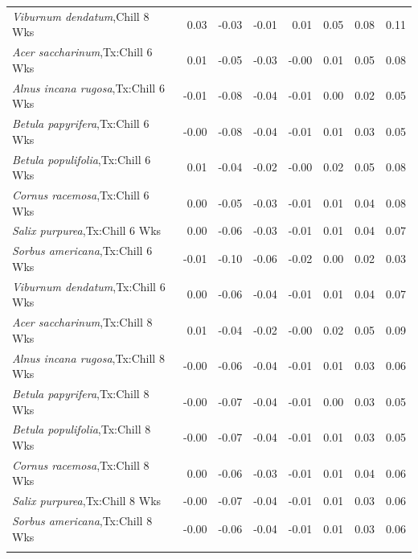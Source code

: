 \documentclass{article}\usepackage[]{graphicx}\usepackage[]{color}
\begin{document}
\begin{longtable}{lrrrrrrr}
  \textit{Viburnum dendatum},Chill 8 Wks & 0.03 & -0.03 & -0.01 & 0.01 & 0.05 & 0.08 & 0.11 \\ 
  \textit{Acer saccharinum},Tx:Chill 6 Wks & 0.01 & -0.05 & -0.03 & -0.00 & 0.01 & 0.05 & 0.08 \\ 
  \textit{Alnus incana rugosa},Tx:Chill 6 Wks & -0.01 & -0.08 & -0.04 & -0.01 & 0.00 & 0.02 & 0.05 \\ 
  \textit{Betula papyrifera},Tx:Chill 6 Wks & -0.00 & -0.08 & -0.04 & -0.01 & 0.01 & 0.03 & 0.05 \\ 
  \textit{Betula populifolia},Tx:Chill 6 Wks & 0.01 & -0.04 & -0.02 & -0.00 & 0.02 & 0.05 & 0.08 \\ 
  \textit{Cornus racemosa},Tx:Chill 6 Wks & 0.00 & -0.05 & -0.03 & -0.01 & 0.01 & 0.04 & 0.08 \\ 
  \textit{Salix purpurea},Tx:Chill 6 Wks & 0.00 & -0.06 & -0.03 & -0.01 & 0.01 & 0.04 & 0.07 \\ 
  \textit{Sorbus americana},Tx:Chill 6 Wks & -0.01 & -0.10 & -0.06 & -0.02 & 0.00 & 0.02 & 0.03 \\ 
  \textit{Viburnum dendatum},Tx:Chill 6 Wks & 0.00 & -0.06 & -0.04 & -0.01 & 0.01 & 0.04 & 0.07 \\ 
  \textit{Acer saccharinum},Tx:Chill 8 Wks & 0.01 & -0.04 & -0.02 & -0.00 & 0.02 & 0.05 & 0.09 \\ 
  \textit{Alnus incana rugosa},Tx:Chill 8 Wks & -0.00 & -0.06 & -0.04 & -0.01 & 0.01 & 0.03 & 0.06 \\ 
  \textit{Betula papyrifera},Tx:Chill 8 Wks & -0.00 & -0.07 & -0.04 & -0.01 & 0.00 & 0.03 & 0.05 \\ 
  \textit{Betula populifolia},Tx:Chill 8 Wks & -0.00 & -0.07 & -0.04 & -0.01 & 0.01 & 0.03 & 0.05 \\ 
  \textit{Cornus racemosa},Tx:Chill 8 Wks & 0.00 & -0.06 & -0.03 & -0.01 & 0.01 & 0.04 & 0.06 \\ 
  \textit{Salix purpurea},Tx:Chill 8 Wks & -0.00 & -0.07 & -0.04 & -0.01 & 0.01 & 0.03 & 0.06 \\ 
  \textit{Sorbus americana},Tx:Chill 8 Wks & -0.00 & -0.06 & -0.04 & -0.01 & 0.01 & 0.03 & 0.06 \\ 
   \hline
\hline
\label{tab:suppmodtough}
\end{longtable}
\end{document}
